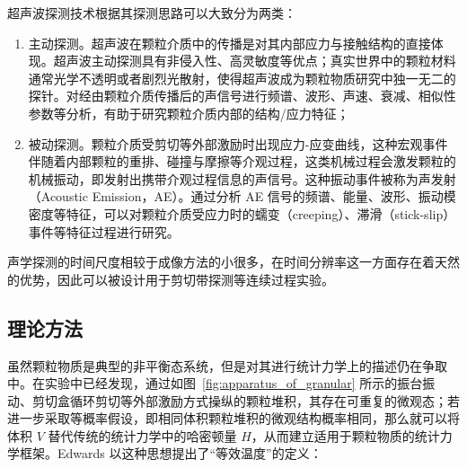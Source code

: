 超声波探测技术根据其探测思路可以大致分为两类：

\begin{enumerate}
  \item 主动探测。超声波在颗粒介质中的传播是对其内部应力与接触结构的直接体现\cite{PhysRevB.48.15646,Jia1999UltrasoundPI,Transitional}。超声波主动探测具有非侵入性、高灵敏度等优点；真实世界中的颗粒材料通常光学不透明或者剧烈光散射，使得超声波成为颗粒物质研究中独一无二的探针。对经由颗粒介质传播后的声信号进行频谱、波形、声速、衰减、相似性参数等分析，有助于研究颗粒介质内部的结构/应力特征；
  \item 被动探测。颗粒介质受剪切等外部激励时出现应力-应变曲线，这种宏观事件伴随着内部颗粒的重排、碰撞与摩擦等介观过程，这类机械过程会激发颗粒的机械振动，即发射出携带介观过程信息的声信号。这种振动事件被称为声发射（Acoustic Emission，AE）。通过分析 AE 信号的频谱、能量、波形、振动模密度等特征\cite{PhysRevLett.120.218003,10.1029/2023JB026612,doi:10.1073/pnas.2305134120}，可以对颗粒介质受应力时的蠕变（creeping）、滞滑（stick-slip）事件等特征过程进行研究。
\end{enumerate}

声学探测的时间尺度相较于成像方法的小很多，在时间分辨率这一方面存在着天然的优势\cite{PhysRevE.84.020301}，因此可以被设计用于剪切带探测\cite{PhysRevE.85.051302}等连续过程实验。


\subsection{理论方法}

虽然颗粒物质是典型的非平衡态系统，但是对其进行统计力学上的描述仍在争取中。在实验中已经发现，通过如图~\eqref{fig:apparatus_of_granular} 所示的振台振动、剪切盒循环剪切等外部激励方式操纵的颗粒堆积，其存在可重复的微观态；若进一步采取等概率假设，即相同体积颗粒堆积的微观结构概率相同，那么就可以将体积 $V$ 替代传统的统计力学中的哈密顿量 $H$，从而建立适用于颗粒物质的统计力学框架。Edwards 以这种思想提出了“等效温度”的定义\cite{EDWARDS19891080}：

